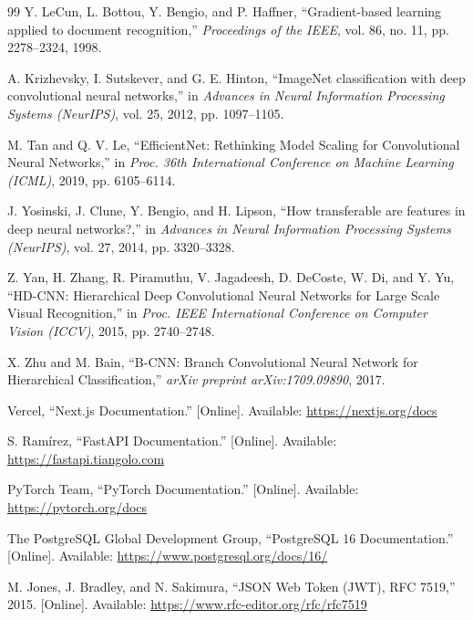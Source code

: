 \documentclass[13pt,a4paper]{article}
\begin{document}
\renewcommand{\refname}{TÀI LIỆU THAM KHẢO}
\begin{thebibliography}{99}
Y. LeCun, L. Bottou, Y. Bengio, and P. Haffner,
``Gradient-based learning applied to document recognition,''
\textit{Proceedings of the IEEE}, vol. 86, no. 11, pp. 2278--2324, 1998.

A. Krizhevsky, I. Sutskever, and G. E. Hinton,
``ImageNet classification with deep convolutional neural networks,''
in \textit{Advances in Neural Information Processing Systems (NeurIPS)}, vol. 25, 2012, pp. 1097--1105.

M. Tan and Q. V. Le,
``EfficientNet: Rethinking Model Scaling for Convolutional Neural Networks,''
in \textit{Proc. 36th International Conference on Machine Learning (ICML)}, 2019, pp. 6105--6114.

J. Yosinski, J. Clune, Y. Bengio, and H. Lipson,
``How transferable are features in deep neural networks?,''
in \textit{Advances in Neural Information Processing Systems (NeurIPS)}, vol. 27, 2014, pp. 3320--3328.

Z. Yan, H. Zhang, R. Piramuthu, V. Jagadeesh, D. DeCoste, W. Di, and Y. Yu,
``HD-CNN: Hierarchical Deep Convolutional Neural Networks for Large Scale Visual Recognition,''
in \textit{Proc. IEEE International Conference on Computer Vision (ICCV)}, 2015, pp. 2740--2748.

X. Zhu and M. Bain,
``B-CNN: Branch Convolutional Neural Network for Hierarchical Classification,''
\textit{arXiv preprint arXiv:1709.09890}, 2017.

Vercel, ``Next.js Documentation.'' [Online]. Available: \url{https://nextjs.org/docs}

S. Ram\'irez, ``FastAPI Documentation.'' [Online]. Available: \url{https://fastapi.tiangolo.com}

PyTorch Team, ``PyTorch Documentation.'' [Online]. Available: \url{https://pytorch.org/docs}

The PostgreSQL Global Development Group, ``PostgreSQL 16 Documentation.'' [Online]. Available: \url{https://www.postgresql.org/docs/16/}

M. Jones, J. Bradley, and N. Sakimura,
``JSON Web Token (JWT), RFC 7519,'' 2015. [Online]. Available: \url{https://www.rfc-editor.org/rfc/rfc7519}
\end{thebibliography}
\end{document}

